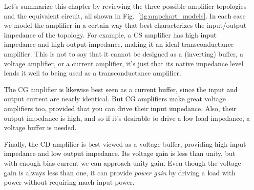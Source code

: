Let's summarize this chapter by reviewing the three possible amplifier topologies and the equivalent circuit, all shown in Fig.~\ref{fig:ampchart_models}.  In each case we model the amplifier in a certain way that best characterizes the input/output impedance of the topology.  For example, a CS amplifier has high input impedance and high output impedance, making it an ideal transconductance amplifier.  This is not to say that it cannot be designed as a (inverting) buffer, a voltage amplifier, or a current amplifier, it's just that its native impedance level lends it well to being used as a transconductance amplifier.  

The CG amplifier is likewise best seen as a current buffer, since the input and output current are nearly identical.  But CG amplifiers make great voltage amplifiers too, provided that you can drive their input impedance.  Also, their output impedance is high, and so if it's desirable to drive a low load impedance, a voltage buffer is needed.  

Finally, the CD amplifier is best viewed as a voltage buffer, providing high input impedance and low output impedance.  Its voltage gain is less than unity, but with enough bias current we can approach unity gain.  Even though the voltage gain is always less than one, it can provide \emph{power gain} by driving a load with power without requiring much input power.











